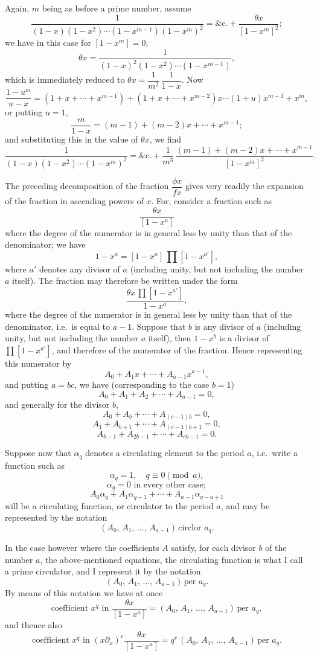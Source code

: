 \documentclass[11pt]{article}
\begin{document}
Again, $m$ being as before a prime number, assume
\[
\frac{1}{(1-x)(1-x^2)\cdots(1-x^{m-1})(1-x^m)^2} = \&\text{c.} + \frac{\theta x}{[1-x^m]^2};
\]
we have in this case for $[1-x^m]=0$,
\[
\theta x = \frac{1}{(1-x)^2(1-x^2)\cdots(1-x^{m-1})},
\]
which is immediately reduced to $\theta x = \dfrac{1}{m^2}\,\dfrac{1}{1-x}$. Now
\[
\frac{1-u^m}{u-x} = (1+x+\cdots+x^{m-1}) + (1+x+\cdots+x^{m-2})x \cdots (1+u)x^{m-1} + x^m,
\]
or putting $u=1$,
\[
\frac{m}{1-x} = (m-1) + (m-2)x + \cdots + x^{m-1};
\]
and substituting this in the value of $\theta x$, we find
\[
\frac{1}{(1-x)(1-x^2)\cdots(1-x^m)^2} = \&\text{c.} + \frac{1}{m^3}\,\frac{(m-1)+(m-2)x+\cdots+x^{m-1}}{[1-x^m]^2}.
\]

The preceding decomposition of the fraction $\dfrac{\phi x}{f x}$ gives very readily the expansion of the fraction in ascending powers of $x$. For, consider a fraction such as
\[
\frac{\theta x}{[1-x^a]}
\]
where the degree of the numerator is in general less by unity than that of the denominator; we have
\[
1-x^a = [1-x^a]\,\prod[1-x^{a'}],
\]
where $a'$ denotes any divisor of $a$ (including unity, but not including the number $a$ itself). The fraction may therefore be written under the form
\[
\frac{\theta x\,\prod[1-x^{a'}]}{1-x^a},
\]
where the degree of the numerator is in general less by unity than that of the denominator, i.e.\ is equal to $a-1$. Suppose that $b$ is any divisor of $a$ (including unity, but not including the number $a$ itself), then $1-x^b$ is a divisor of $\prod[1-x^{a'}]$, and therefore of the numerator of the fraction. Hence representing this numerator by
\[
A_0 + A_1 x + \cdots + A_{a-1}x^{a-1},
\]
and putting $a = bc$, we have (corresponding to the case $b=1$)
\[
A_0 + A_1 + A_2 + \cdots + A_{a-1} = 0,
\]
and generally for the divisor $b$,
\[
A_0 + A_b + \cdots + A_{(c-1)b} = 0,
\]
\[
A_1 + A_{b+1} + \cdots + A_{(c-1)b+1} = 0,
\]
\[
A_{b-1} + A_{2b-1} + \cdots + A_{cb-1} = 0.
\]

Suppose now that $\alpha_q$ denotes a circulating element to the period $a$, i.e.\ write a function such as
\[
\alpha_q = 1, \quad q \equiv 0 \pmod{a},
\]
\[
\alpha_q = 0 \text{ in every other case};
\]
\[
A_0 \alpha_q + A_1 \alpha_{q-1} + \cdots + A_{a-1}\alpha_{q-a+1}
\]
will be a circulating function, or circulator to the period $a$, and may be represented by the notation
\[
(A_0,\, A_1,\, \ldots,\, A_{a-1})\,\text{circlor }a_q.
\]

In the case however where the coefficients $A$ satisfy, for each divisor $b$ of the number $a$, the above-mentioned equations, the circulating function is what I call a prime circulator, and I represent it by the notation
\[
(A_0,\, A_1,\, \ldots,\, A_{a-1})\,\text{per }a_q.
\]
By means of this notation we have at once
\[
\text{coefficient } x^q \text{ in } \frac{\theta x}{[1-x^a]} = (A_0,\, A_1,\, \ldots,\, A_{a-1})\,\text{per }a_q,
\]
and thence also
\[
\text{coefficient } x^q \text{ in } (x \partial_x)^r \frac{\theta x}{[1-x^a]} = q^r\,(A_0,\, A_1,\, \ldots,\, A_{a-1})\,\text{per }a_q.
\]
\end{document}
